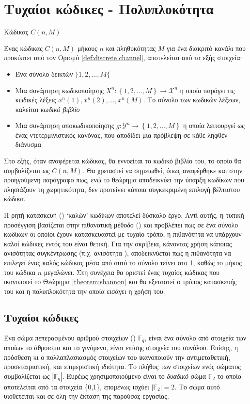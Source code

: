 \section{Τυχαίοι κώδικες - Πολυπλοκότητα}
\begin{definition}{Κώδικας $C(n,M)$}

Ένας κώδικας $C(n,M)$ μήκους $n$ και πληθυκότητας $M$ για ένα διακριτό κανάλι που προκύπτει από τον Ορισμό \ref{def:discrete channel}, αποτελείται από τα εξής στοιχεία:
\begin{itemize}
\item Ένα σύνολο δεικτών $\rbrace1, 2, \ldots, M\lbrace$ 
\item Μια συνάρτηση κωδικοποίησης $X^n:\left\lbrace1, 2, \ldots, M\right\rbrace\to\mathcal{X}^n$ η οποία παράγει τις κωδικές λέξεις $x^n\left(1\right), x^n\left(2\right), \ldots, x^n\left(M\right)$. Το σύνολο των κωδικών λέξεων, καλείται \textit{κωδικό βιβλίο}
\item Μια συνάρτηση αποκωδικοποίησης $g:\mathcal{Y}^n\to\left\lbrace1, 2, \ldots, M\right\rbrace$ η οποία λειτουργεί ως ένας ντετερμινιστικός κανόνας, που αποδίδει μια πρόβλεψη σε κάθε ληφθέν διάνυσμα
\end{itemize}
\label{def:code}
\end{definition}

Στο εξής, όταν αναφέρεται κώδικας, θα εννοείται το κωδικό βιβλίο του, το οποίο θα συμβολίζεται ως $C(n,M)$. Θα χρειαστεί να σημειωθεί, όπως αναφέρθηκε και στην προηγούμενη παράγραφο πως, ενώ το θεώρημα  αποδεικνύει την ύπαρξη κωδίκων που πλησιάζουν τη χωρητικότητα, δεν προτείνει κάποια συγκεκριμένη επιλογή βέλτιστου κώδικα.

Η ρητή κατασκευή () \enquote*{καλών} κωδίκων αποτελεί δύσκολο έργο. Αντί αυτής, η τυπική προσέγγιση βασίζεται στην πιθανοτική μέθοδο () και προβλέπει πως σε ένα σύνολο κωδίκων οι οποίοι έχουν κατασκευαστεί με τυχαίο τρόπο, η πιθανότητα να υπάρχουν καλοί κώδικες εντός του είναι θετική. Για την ακρίβεια, κάνοντας χρήση κάποιας ανισότητας συγκέντρωσης (π.χ. ανισότητα ), αποδεικνύεται πως η πιθανότητα να επιλεγεί ένας καλός κώδικας μέσα από αυτό το σύνολο τείνει στο 1, καθώς το μήκος του κώδικα $n$ μεγαλώνει. Στη συνέχεια θα οριστεί ένας τυχαίος κώδικας που ικανοποιεί το Θεώρημα \ref{theorem:shannon} και θα εξεταστεί ο τρόπος κατασκευής του και η πολυπλοκότητα την οποία εισάγει η χρήση του.

\subsection{Τυχαίοι κώδικες}
Ένα σώμα πεπερασμένου αριθμού στοιχείων () $\mathbb{F}_q$, είναι ένα σύνολο από στοιχεία των οποίων το άθροισμα και το γινόμενο, είναι επίσης στοιχεία του συνόλου. Επίσης, η πρόσθεση κι ο πολλαπλασιασμός στοιχείων του ικανοποιούν την αντιμεταθετική, προσεταιριστική, και επιμεριστική ιδιότητα. Tο πλήθος των στοιχείων ενός σώματος συμβολίζεται ως $|\mathbb{F}_q|$. Ευρέως χρησιμοποιούμενο είναι το \textit{δυαδικό} σώμα $\mathbb{F}_2$ το οποίο αποτελείται από τα στοιχεία \{0,1\}, επομένως ισχύει $|\mathbb{F}_2|=2$. Το σώμα αυτό υιοθετείται και σε όλη την έκταση της παρούσας εργασίας.


